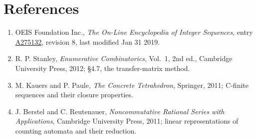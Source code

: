 \documentclass[11pt]{article}
\theoremstyle{definition}
\begin{document}
\section{References}

\begin{enumerate}

\item OEIS Foundation Inc., \emph{The On-Line Encyclopedia of Integer Sequences}, entry \href{https://oeis.org/A275132}{A275132}, revision 8, last modified Jan 31 2019.

\item R. P. Stanley, \emph{Enumerative Combinatorics}, Vol.~1, 2nd ed., Cambridge University Press, 2012; \S4.7, the transfer-matrix method.

\item M. Kauers and P. Paule, \emph{The Concrete Tetrahedron}, Springer, 2011; C-finite sequences and their closure properties.

\item J. Berstel and C. Reutenauer, \emph{Noncommutative Rational Series with Applications}, Cambridge University Press, 2011; linear representations of counting automata and their reduction.

\end{enumerate}
\end{document}
